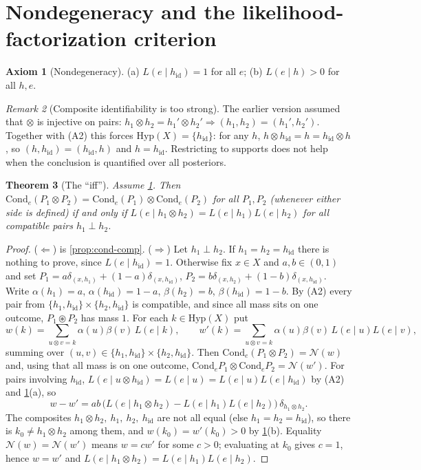 \documentclass[11pt]{article}
\newtheorem{theorem}{Theorem}[section]
\theoremstyle{definition}
\newtheorem{axiom}[theorem]{Axiom}
\theoremstyle{remark}
\newtheorem{remark}[theorem]{Remark}
\newcommand{\Hyp}{\mathrm{Hyp}}
\newcommand{\Cond}{\mathrm{Cond}}
\newcommand{\hid}{h_{\mathrm{id}}}
\newcommand{\N}{\mathcal{N}}
\newcommand{\cp}{\circledast}
\begin{document}
\section{Nondegeneracy and the likelihood-factorization criterion}

\begin{axiom}[Nondegeneracy]\label{ax:nondeg}
(a) $L(e\mid\hid)=1$ for all $e$; (b) $L(e\mid h)>0$ for all $h,e$.
\end{axiom}

\begin{remark}[Composite identifiability is too strong]\label{rem:ci}
The earlier version assumed that $\otimes$ is injective on pairs:
$h_1\otimes h_2=h_1'\otimes h_2'\Rightarrow(h_1,h_2)=(h_1',h_2')$. Together with (A2) this forces
$\Hyp(X)=\{\hid\}$: for any $h$, $h\otimes\hid=h=\hid\otimes h$, so $(h,\hid)=(\hid,h)$ and $h=\hid$.
Restricting to supports does not help when the conclusion is quantified over all posteriors.
\end{remark}

\begin{theorem}[The ``iff'']\label{thm:iff}
Assume \cref{ax:nondeg}. Then $\Cond_e(P_1\otimes P_2)=\Cond_e(P_1)\otimes\Cond_e(P_2)$ for all
$P_1,P_2$ (whenever either side is defined) if and only if
$L(e\mid h_1\otimes h_2)=L(e\mid h_1)L(e\mid h_2)$ for all compatible pairs $h_1\perp h_2$.
\end{theorem}
\begin{proof}
($\Leftarrow$) is \cref{prop:cond-comp}. ($\Rightarrow$) Let $h_1\perp h_2$. If $h_1=h_2=\hid$ there
is nothing to prove, since $L(e\mid\hid)=1$. Otherwise fix $x\in X$ and $a,b\in(0,1)$ and set
$P_1=a\delta_{(x,h_1)}+(1-a)\delta_{(x,\hid)}$, $P_2=b\delta_{(x,h_2)}+(1-b)\delta_{(x,\hid)}$. Write
$\alpha(h_1)=a$, $\alpha(\hid)=1-a$, $\beta(h_2)=b$, $\beta(\hid)=1-b$. By (A2) every pair from
$\{h_1,\hid\}\times\{h_2,\hid\}$ is compatible, and since all mass sits on one outcome, $P_1\cp P_2$
has mass $1$. For each $k\in\Hyp(X)$ put
\[
w(k)=\sum_{u\otimes v=k}\alpha(u)\beta(v)\,L(e\mid k),\qquad
w'(k)=\sum_{u\otimes v=k}\alpha(u)\beta(v)\,L(e\mid u)L(e\mid v),
\]
summing over $(u,v)\in\{h_1,\hid\}\times\{h_2,\hid\}$. Then $\Cond_e(P_1\otimes P_2)=\N(w)$ and, using
that all mass is on one outcome, $\Cond_eP_1\otimes\Cond_eP_2=\N(w')$. For pairs involving $\hid$,
$L(e\mid u\otimes\hid)=L(e\mid u)=L(e\mid u)L(e\mid\hid)$ by (A2) and \cref{ax:nondeg}(a), so
\[
w-w'=ab\,\big(L(e\mid h_1\otimes h_2)-L(e\mid h_1)L(e\mid h_2)\big)\,\delta_{h_1\otimes h_2}.
\]
The composites $h_1\otimes h_2,\ h_1,\ h_2,\ \hid$ are not all equal (else $h_1=h_2=\hid$), so there is
$k_0\neq h_1\otimes h_2$ among them, and $w(k_0)=w'(k_0)>0$ by \cref{ax:nondeg}(b). Equality
$\N(w)=\N(w')$ means $w=cw'$ for some $c>0$; evaluating at $k_0$ gives $c=1$, hence $w=w'$ and
$L(e\mid h_1\otimes h_2)=L(e\mid h_1)L(e\mid h_2)$.
\end{proof}
\end{document}
